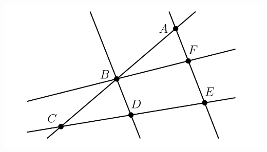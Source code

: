 \documentclass{article}
\begin{document}
\begin{enumerate}
\begin{center}
            \includegraphics[scale=0.2]{1-1lines.png}
        \end{center}
\end{enumerate}
\end{document}
